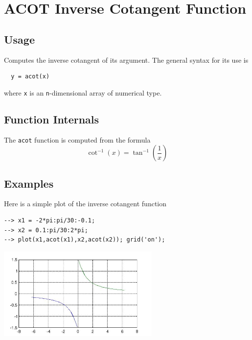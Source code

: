 \section{ACOT Inverse Cotangent Function}

\subsection{Usage}

Computes the inverse cotangent of its argument.  The general
syntax for its use is
\begin{verbatim}
  y = acot(x)
\end{verbatim}
where \verb|x| is an \verb|n|-dimensional array of numerical type.
\subsection{Function Internals}

The \verb|acot| function is computed from the formula
\[
   \cot^{-1}(x) = \tan^{-1}\left(\frac{1}{x}\right)
\]
\subsection{Examples}

Here is a simple plot of the inverse cotangent function
\begin{verbatim}
--> x1 = -2*pi:pi/30:-0.1;
--> x2 = 0.1:pi/30:2*pi;
--> plot(x1,acot(x1),x2,acot(x2)); grid('on');
\end{verbatim}


\centerline{\includegraphics[width=8cm]{acotplot}}

